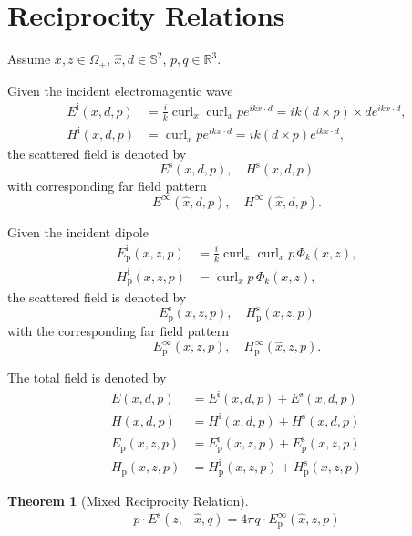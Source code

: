 \documentclass[a4paper,12pt]{article}
\theoremstyle{definition}
\newtheorem{thm}{Theorem}
\DeclareMathOperator\curl{curl}
\begin{document}

\section{Reciprocity Relations}

Assume $x, z\in\Omega_+$, $\hat{x}, d\in\mathbb{S}^2$, $p, q\in\mathbb{R}^3$.  

Given the incident electromagentic wave 
\begin{align*}
  E^\text{i}(x, d, p) &= \frac{i}{k}\curl_x\curl_x p e^{ikx\cdot d} = ik(d\times p)\times d e^{ikx\cdot d}, \\
  H^\text{i}(x, d, p) &= \curl_x p e^{ikx\cdot d} = ik(d\times p)e^{ikx\cdot d}, 
\end{align*} 
the scattered field is denoted by 
$$E^\text{s}(x, d, p),\quad H^\text{s}(x, d, p)$$
with corresponding far field pattern
$$E^\infty(\hat{x}, d, p), \quad H^\infty(\hat{x}, d, p).$$

Given the incident dipole 
\begin{align*}
  E_\text{p}^\text{i}(x, z, p) &= \frac{i}{k}\curl_x\curl_x p\,\Phi_k(x, z), \\
  H_\text{p}^\text{i}(x, z, p) &= \curl_x p\,\Phi_k(x, z),
\end{align*}
the scattered field is denoted by 
$$E_\text{p}^\text{s}(x, z, p),\quad H_\text{p}^\text{s}(x, z, p)$$ 
with the corresponding far field pattern
$$E_\text{p}^\infty(\hat{x}, z, p),\quad H_\text{p}^\infty(\hat{x}, z, p).$$

The total field is denoted by 
\begin{align*}
  E(x, d, p) &= E^\text{i}(x, d, p) + E^\text{s}(x, d, p)\\
  H(x, d, p) &= H^\text{i}(x, d, p) + H^\text{s}(x, d, p) \\
  E_\text{p}(x, z, p) &= E_\text{p}^\text{i}(x, z, p) + E_\text{p}^\text{s}(x, z, p)\\
  H_\text{p}(x, z, p) &= H_\text{p}^\text{i}(x, z, p) + H_\text{p}^\text{s}(x, z, p)
\end{align*}

\begin{thm}[Mixed Reciprocity Relation]
  \begin{align*}
    p\cdot E^\text{s}(z, -\hat{x}, q) = 4\pi q\cdot E_\text{p}^\infty(\hat{x}, z, p)
  \end{align*}
\end{thm}
\end{document}
